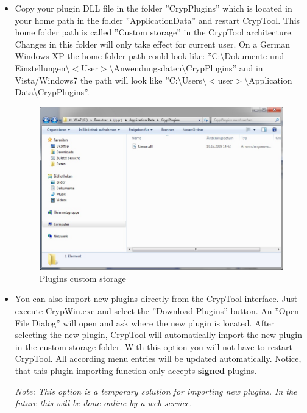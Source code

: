 \begin{itemize}
	\item Copy your plugin DLL file in the folder ''CrypPlugins'' which is located in your home path in the folder ''ApplicationData'' and restart CrypTool.  This home folder path is called ''Custom storage'' in the CrypTool architecture. Changes in this folder will only take effect for current user.  On a German Windows XP the home folder path could look like:
''C:\textbackslash Dokumente und Einstellungen\textbackslash $<$User$>$\textbackslash Anwendungsdaten\textbackslash CrypPlugins'' and in Vista/Windows7 the path will look like ''C:\textbackslash Users\textbackslash $<$user$>$\textbackslash Application Data\textbackslash CrypPlugins''.\clearpage
\begin{figure}[h]
	\centering
		\includegraphics[width=1.00\textwidth]{figures/custom_storage.jpg}
	\caption{Plugins custom storage}
	\label{fig:custom_storage}
\end{figure}
	\item You can also import new plugins directly from the CrypTool interface. Just execute CrypWin.exe and select the ''Download Plugins'' button. An ''Open File Dialog'' will open and ask where the new plugin is located. After selecting the new plugin, CrypTool will automatically import the new plugin in the custom storage folder. With this option you will not have to restart CrypTool. All according menu entries will be updated automatically.
Notice, that this plugin importing function only accepts \textbf{signed} plugins.

\textit{\small Note: This option is a temporary solution for importing new plugins. In the future this will be done online by a web service.}\clearpage


\end{itemize}
